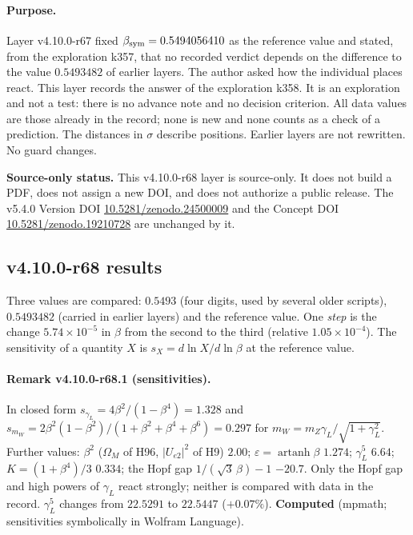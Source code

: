 \paragraph{Purpose.}
Layer v4.10.0-r67 fixed \(\beta_{\rm sym}=0.5494056410\) as the reference value and stated, from the exploration k357, that no recorded verdict
depends on the difference to the value \(0.5493482\) of earlier layers.  The author asked how the individual places react.  This layer records
the answer of the exploration k358.  It is an exploration and not a test: there is no advance note and no decision criterion.  All data values
are those already in the record; none is new and none counts as a check of a prediction.  The distances in \(\sigma\) describe positions.
Earlier layers are not rewritten.  No guard changes.

\noindent\textbf{Source-only status.}
This v4.10.0-r68 layer is source-only.  It does not build a PDF, does not assign a new DOI,
and does not authorize a public release.  The v5.4.0 Version DOI
\href{https://doi.org/10.5281/zenodo.24500009}{10.5281/zenodo.24500009} and the Concept DOI
\href{https://doi.org/10.5281/zenodo.19210728}{10.5281/zenodo.19210728} are unchanged by it.

\subsection*{v4.10.0-r68 results}
\label{subsec:v4100-r68-results}

Three values are compared: \(0.5493\) (four digits, used by several older scripts), \(0.5493482\) (carried in earlier layers) and the reference
value.  One \emph{step} is the change \(5.74\times10^{-5}\) in \(\beta\) from the second to the third (relative \(1.05\times10^{-4}\)).
The sensitivity of a quantity \(X\) is \(s_X=d\ln X/d\ln\beta\) at the reference value.

\paragraph{Remark v4.10.0-r68.1 (sensitivities).}
In closed form \(s_{\gamma_L}=4\beta^2/(1-\beta^4)=1.328\) and \(s_{m_W}=2\beta^2(1-\beta^2)/(1+\beta^2+\beta^4+\beta^6)=0.297\) for
\(m_W=m_Z\gamma_L/\sqrt{1+\gamma_L^2}\).  Further values: \(\beta^2\) (\(\Omega_M\) of H96, \(|U_{e2}|^2\) of H9) \(2.00\);
\(\varepsilon=\operatorname{artanh}\beta\) \(1.274\); \(\gamma_L^5\) \(6.64\); \(K=(1+\beta^4)/3\) \(0.334\); the Hopf gap
\(1/(\sqrt3\,\beta)-1\) \(-20.7\).  Only the Hopf gap and high powers of \(\gamma_L\) react strongly; neither is compared with data in the
record.  \(\gamma_L^5\) changes from \(22.5291\) to \(22.5447\) (\(+0.07\%\)).  \textbf{Computed} (mpmath; sensitivities symbolically in
Wolfram Language).

